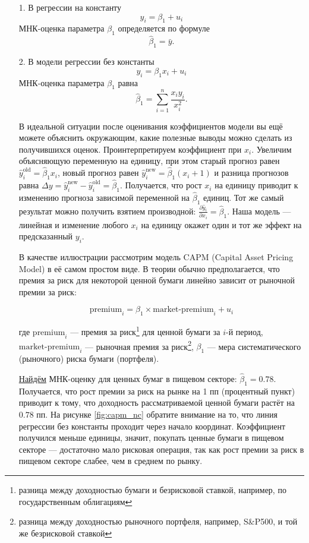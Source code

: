 \documentclass[12pt]{article}
\newcommand{\hb}{\hat{\beta}}
\newcommand{\hy}{\hat{y}}
\newcommand{\new}{\text{new}}
\newcommand{\old}{\text{old}}
\begin{document}
\begin{enumerate}
    \item[1.] В регрессии на константу
\[
y_i = \beta_1 + u_i
\]
МНК-оценка параметра $\beta_1$ определяется по формуле
\[
\hb_1 = \bar{y}.
\]

\item[2.] В модели регрессии без константы
\[
y_i = \beta_1 x_i + u_i
\]
МНК-оценка параметра $\beta_1$ равна 
\[
\hb_1 = \sum_{i=1}^n \frac{x_i y_i}{x_i^2}.
\]

В идеальной ситуации после оценивания коэффициентов модели вы ещё можете объяснить окружающим, какие полезные выводы можно сделать из получившихся оценок. 
Проинтерпретируем коэффициент при $x_i$. 
Увеличим объясняющую переменную на единицу, при этом старый прогноз равен $\hy_i^{\old} = \hb_1 x_i$, новый прогноз равен $\hy_i^{\new} = \hb_1 (x_i + 1)$ и разница прогнозов равна $\Delta y = \hy_i^{\new} - \hy_i^{\old} = \hb_1$. 
Получается, что рост $x_i$ на единицу приводит к изменению прогноза зависимой переменной на $\hb_1$ единиц. 
Тот же самый результат можно получить взятием производной: $\frac{\partial \hy_i}{\partial x_i} = \hb_1$.
Наша модель — линейная и изменение любого $x_i$ на единицу окажет один и тот же эффект на предсказанный $y_i$.

В качестве иллюстрации рассмотрим модель CAPM (Capital Asset Pricing Model) в её самом простом виде. 
В теории обычно предполагается, что премия за риск для некоторой ценной бумаги линейно зависит от рыночной премии за риск:

\[\text{premium}_i = \beta_1 \times \text{market-premium}_i + u_i\]

где $\text{premium}_i$ — премия за риск\footnote{разница между доходностью бумаги и безрисковой ставкой, например, по государственным облигациям} для ценной бумаги за $i$-й период,
$\text{market-premium}_i$ — рыночная премия за риск\footnote{разница между доходностью рыночного портфеля, например, S\&P500, и той же безрисковой ставкой},
$\beta_1$ — мера систематического (рыночного) риска бумаги (портфеля).

\href{https://colab.research.google.com/drive/1ZQ7QuVCJS4I_GsXUrr7z7O-3wqXkXSMN?usp=sharing}{Найдём} МНК-оценку для ценных бумаг в пищевом секторе: $\hb_1 = 0.78$. 
Получается, что рост премии за риск на рынке на 1 пп (процентный пункт) приводит к тому, что доходность рассматриваемой ценной бумаги растёт на $0.78$ пп. 
На рисунке \ref{fig:capm_nc} обратите внимание на то, что линия регрессии без константы проходит через начало координат. 
Коэффициент получился меньше единицы, значит, покупать ценные бумаги в пищевом секторе — достаточно мало рисковая операция, так как рост премии за риск в пищевом секторе слабее, чем в среднем по рынку.


\end{enumerate}
\end{document}
